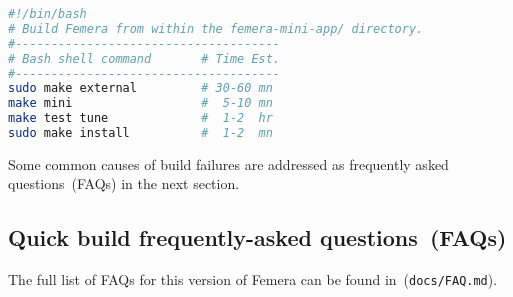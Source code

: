 \begin{center}
\begin{lstlisting}[caption={Build and install Femera in system directories.},
label={lis:quick-start-sys},language=bash,float=ht]
#!/bin/bash
# Build Femera from within the femera-mini-app/ directory.
#-------------------------------------
# Bash shell command       # Time Est.
#-------------------------------------
sudo make external         # 30-60 mn
make mini                  #  5-10 mn
make test tune             #  1-2  hr
sudo make install          #  1-2  mn
\end{lstlisting}
\begin{comment}
tdd:tests/pre-build/quick\_start\_user\_sys\_listings\_is\_same\_with\_sudo\_lines.py
\end{comment}
\end{center}

Some common causes of build failures are addressed as frequently asked
questions~(FAQs) in the next section.

\subsection{Quick build frequently-asked questions~(FAQs)\label{subsec:Quick-faqs}}

The full list of FAQs for this version of Femera can be found
in~(\texttt{docs/FAQ.md}).
\begin{comment} or at
(\texttt{https://github.com/waggyz/femera-mini-app/docs/FAQ.md}).
\end{comment}
\begin{comment}
tdd:tests/pre-build/quick\_start\_faqs\_are\_in\_docs\_FAQ\_file.py
\end{comment}

